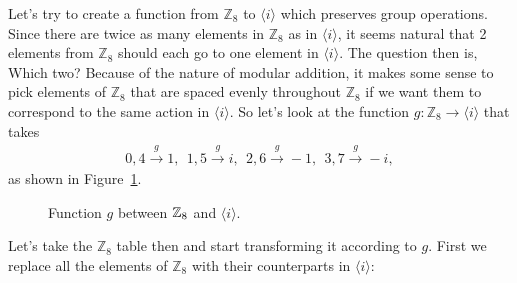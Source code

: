 \begin{example}\label{example:homomorph:Z_8_i homomorph}
Let's try to create a function from ${\mathbb Z_8}$ to $\langle i \rangle$ which preserves group operations.  Since there are twice as many elements  in ${\mathbb Z_8}$ as in $\langle i \rangle$,  it seems natural that 2 elements from  ${\mathbb Z_8}$ should each go to one element in $\langle i \rangle$.  The question then is, Which two?  
 Because of the nature of modular addition, it makes some sense to pick elements of ${\mathbb Z_8}$ that are spaced evenly throughout ${\mathbb Z_8}$ if we want them to correspond to the same action in $\langle i \rangle$.  So let's look at the function  $g: {\mathbb Z}_8 \rightarrow \langle i \rangle$  that takes 
\begin{align*}
    0,4 \overset{g}{\longrightarrow} 1 ,~~     1,5 \overset{g}{\longrightarrow} i,~~    2,6 \overset{g}{\longrightarrow} -1,~~   3,7 \overset{g}{\longrightarrow} -i,  
\end{align*}
\noindent
as shown in Figure~\ref{fig:homomorph1}.

\begin{figure}[htb]
	  \caption{\label{fig:homomorph1} Function $g$ between $\mathbb{Z}_8$ and $\langle i \rangle$. }
\end{figure}
\vspace{2 cm}

Let's take the  ${\mathbb Z_8}$ table then and start transforming it according to $g$.  First we replace all the elements of  ${\mathbb Z_8}$ with their counterparts in $\langle i \rangle$:


\end{example}
